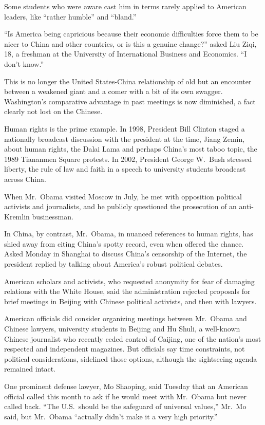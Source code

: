 ﻿\documentclass[12pt]{article}
\begin{document}
Some students who were aware cast him in terms rarely applied to American leaders, like ``rather
humble'' and ``bland.''

``Is America being capricious because their economic difficulties force them to be nicer to China
and other countries, or is this a genuine change?'' asked Liu Ziqi, 18, a freshman at the University
of International Business and Economics. ``I don't know.''

This is no longer the United States-China relationship of old but an encounter between a weakened
giant and a comer with a bit of its own swagger. Washington's comparative advantage in past meetings
is now diminished, a fact clearly not lost on the Chinese.

Human rights is the prime example. In 1998, President Bill Clinton staged a nationally broadcast
discussion with the president at the time, Jiang Zemin, about human rights, the Dalai Lama and
perhaps China's most taboo topic, the 1989 Tiananmen Square protests. In 2002, President George
W.~Bush stressed liberty, the rule of law and faith in a speech to university students broadcast
across China.

When Mr.~Obama visited Moscow in July, he met with opposition political activists and journalists,
and he publicly questioned the prosecution of an anti-Kremlin businessman.

In China, by contrast, Mr.~Obama, in nuanced references to human rights, has shied away from citing
China's spotty record, even when offered the chance. Asked Monday in Shanghai to discuss China's
censorship of the Internet, the president replied by talking about America's robust political
debates.

American scholars and activists, who requested anonymity for fear of damaging relations with the
White House, said the administration rejected proposals for brief meetings in Beijing with Chinese
political activists, and then with lawyers.

American officials did consider organizing meetings between Mr.~Obama and Chinese lawyers,
university students in Beijing and Hu Shuli, a well-known Chinese journalist who recently ceded
control of Caijing, one of the nation's most respected and independent magazines. But officials say
time constraints, not political considerations, sidelined those options, although the sightseeing
agenda remained intact.

One prominent defense lawyer, Mo Shaoping, said Tuesday that an American official called this month
to ask if he would meet with Mr.~Obama but never called back. ``The U.S.~should be the safeguard of
universal values,'' Mr.~Mo said, but Mr.~Obama ``actually didn't make it a very high priority.''
\end{document}
